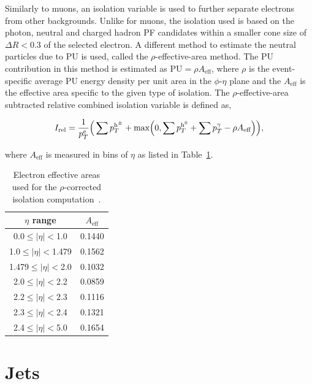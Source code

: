 Similarly to muons, an isolation variable is used to further separate electrons from other backgrounds.
Unlike for muons, the isolation used is based on the photon, neutral and charged hadron \ac{PF} candidates within a smaller cone size of $\Delta R<0.3$ of the selected electron.
A different method to estimate the neutral particles due to \ac{PU} is used, called the $\rho$-effective-area method. 
The \ac{PU} contribution in this method is estimated as $\text{PU}=\rho A_{\text{eff}}$, where $\rho$ is the event-specific average \ac{PU} energy density per unit area in the $\phi$-$\eta$ plane and the $A_{\text{eff}}$ is the effective area specific to the given type of isolation. 
The $\rho$-effective-area subtracted relative combined isolation variable is defined as,

\begin{equation}
\label{eqn:electron_reliso_rho}
I_{\text{rel}} = \frac{1}{p_{T}^{e}} \Big( \sum p_{T}^{\text{h}^{\pm}} + \text{max}\Big( 0, \sum p_{T}^{\text{h}^0} + \sum p_{T}^{\gamma} - \rho A_{\text{eff}} \Big) \Big),
\end{equation}

where $A_{\text{eff}}$ is measured in bins of $\eta$ as listed in Table~\ref{tab:EleEA}.

\begin{table}[htb]
\begin{center}
\begin{tabular}{|c|c|}
\hline
$\eta$ range & $A_{\text{eff}}$ \\
\hline
\hline
0.0$\leq|\eta|<$1.0   &  0.1440 \\
1.0$\leq|\eta|<$1.479 &  0.1562 \\
1.479$\leq|\eta|<$2.0 &  0.1032 \\
2.0$\leq|\eta|<$2.2   &  0.0859 \\
2.2$\leq|\eta|<$2.3   &  0.1116 \\
2.3$\leq|\eta|<$2.4   &  0.1321 \\
2.4$\leq|\eta|<$5.0   &  0.1654 \\
\hline
\end{tabular}
\end{center}
\caption[Electron effective areas used for the $\rho$-corrected isolation computation.]{
 Electron effective areas used for the $\rho$-corrected isolation computation~\cite{CMS:2015xaf}.
}
\label{tab:EleEA}
\end{table}

\section{Jets}

